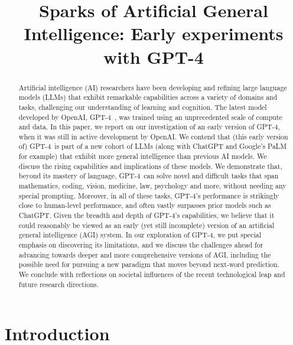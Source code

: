 \title{Sparks of Artificial General Intelligence: Early experiments with GPT-4}

\begin{abstract}
Artificial intelligence (AI) researchers have been developing and refining large language models (LLMs) that exhibit remarkable capabilities across a variety of domains and tasks, challenging our understanding of learning and cognition. The latest model developed by OpenAI, GPT-4\ \cite{gpt4}, was trained using an unprecedented scale of compute and data. In this paper, we report on our investigation of an early version of GPT-4, when it was still in active development by OpenAI. We contend that (this early version of) GPT-4\ is part of a new cohort of LLMs (along with ChatGPT and Google's PaLM for example) that exhibit more general intelligence than previous AI models. We discuss the rising capabilities and implications of these models. We demonstrate that, beyond its mastery of language, GPT-4\ can solve novel and difficult tasks that span mathematics, coding, vision, medicine, law, psychology and more, without needing any special prompting. Moreover, in all of these tasks, GPT-4's performance is strikingly close to human-level performance, and often vastly surpasses prior models such as ChatGPT. Given the breadth and depth of GPT-4's capabilities, we believe that it could reasonably be viewed as an early (yet still incomplete) version of an artificial general intelligence (AGI) system. In our exploration of GPT-4, we put special emphasis on discovering its limitations, and we discuss the challenges ahead for advancing towards deeper and more comprehensive versions of AGI, including the possible need for pursuing a new paradigm that moves beyond next-word prediction. We conclude with reflections on societal influences of the recent technological leap and future research directions.
\end{abstract}

\section{Introduction}
    \label{sec:intro}   

